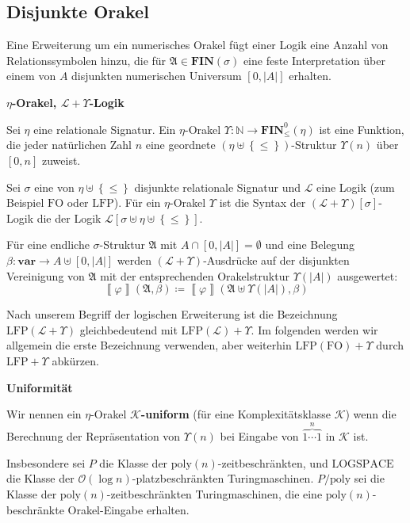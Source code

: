 \subsection{Disjunkte Orakel}

Eine Erweiterung um ein numerisches Orakel fügt einer Logik eine Anzahl
von Relationssymbolen hinzu, die für $\mathfrak{A}\in\mathbf{FIN}\left(\sigma\right)$
eine feste Interpretation über einem von $A$ disjunkten numerischen
Universum $\left[0,\left|A\right|\right]$ erhalten.
\begin{defn}
\textbf{$\eta$-Orakel, $\mathcal{L}+\Upsilon$-Logik}

Sei $\eta$ eine relationale Signatur. Ein $\eta$-Orakel $\Upsilon:\mathbb{N}\rightarrow\mathbf{FIN}_{\leqslant}^{0}\left(\eta\right)$
ist eine Funktion, die jeder natürlichen Zahl $n$ eine geordnete
$\left(\eta\uplus\left\{ \leqslant\right\} \right)$-Struktur $\Upsilon\left(n\right)$
über $\left[0,n\right]$ zuweist.

Sei $\sigma$ eine von $\eta\uplus\left\{ \leqslant\right\} $ disjunkte
relationale Signatur und $\mathcal{L}$ eine Logik (zum Beispiel $\mathrm{FO}$
oder $\mathrm{LFP}$). Für ein $\eta$-Orakel $\Upsilon$ ist die
Syntax der $\left(\mathcal{L}+\Upsilon\right)\left[\sigma\right]$-Logik
die der Logik $\mathcal{L}\left[\sigma\uplus\eta\uplus\left\{ \leqslant\right\} \right]$.

Für eine endliche $\sigma$-Struktur $\mathfrak{A}$ mit $A\cap\left[0,\left|A\right|\right]=\emptyset$
und eine Belegung $\beta:\mathbf{var}\rightarrow A\uplus\left[0,\left|A\right|\right]$
werden $\left(\mathcal{L}+\Upsilon\right)$-Ausdrücke auf der disjunkten
Vereinigung von $\mathfrak{A}$ mit der entsprechenden Orakelstruktur
$\Upsilon\left(\left|A\right|\right)$ ausgewertet:
\[
\left\llbracket \varphi\right\rrbracket \left(\mathfrak{A},\beta\right)\coloneqq\left\llbracket \varphi\right\rrbracket \left(\mathfrak{A}\uplus\Upsilon\left(\left|A\right|\right),\beta\right)
\]
\end{defn}
\begin{notation}
Nach unserem Begriff der logischen Erweiterung ist die Bezeichnung
$\mathrm{LFP}\left(\mathcal{L}+\Upsilon\right)$ gleichbedeutend mit
$\mathrm{LFP}\left(\mathcal{L}\right)+\Upsilon$. Im folgenden werden
wir allgemein die erste Bezeichnung verwenden, aber weiterhin $\mathrm{LFP}\left(\mathrm{FO}\right)+\Upsilon$
durch $\mathrm{LFP}+\Upsilon$ abkürzen.
\end{notation}
\begin{defn}
\textbf{Uniformität}

Wir nennen ein $\eta$-Orakel \textbf{$\mathcal{K}$-uniform} (für
eine Komplexitätsklasse $\mathcal{K}$) wenn die Berechnung der Repräsentation
von $\Upsilon\left(n\right)$ bei Eingabe von $\overset{n}{\overbrace{1\cdots1}}$
in $\mathcal{K}$ ist.

Insbesondere sei $P$ die Klasse der $\mathrm{poly}\left(n\right)$-zeitbeschränkten,
und $\mathrm{LOGSPACE}$ die Klasse der $\mathcal{O}\left(\log n\right)$-platzbeschränkten
Turingmaschinen. $P/\mathrm{poly}$ sei die Klasse der $\mathrm{poly}\left(n\right)$-zeitbeschränkten
Turingmaschinen, die eine $\mathrm{poly}\left(n\right)$-beschränkte
Orakel-Eingabe erhalten.
\end{defn}
